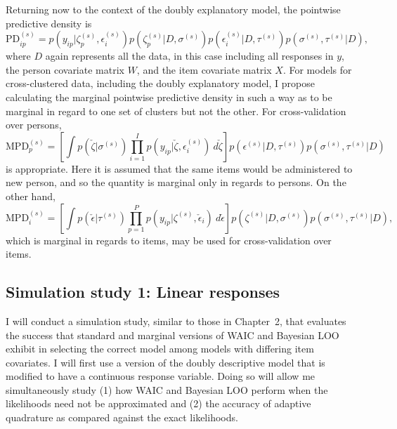 \documentclass[letterpaper]{article}
\begin{document}
Returning now to the context of the doubly explanatory model, the pointwise predictive density is
\begin{equation} \label{eq:eirm-lpd}
	\mathrm{PD}_{ip}^{(s)} = 
		p(y_{ip} | \zeta_p^{(s)}, \epsilon_i^{(s)})
		p(\zeta_p^{(s)} | D, \sigma^{(s)})
		p(\epsilon_i^{(s)} | D, \tau^{(s)}) 
		p(\sigma^{(s)}, \tau^{(s)} | D)
,\end{equation}
where $D$ again represents all the data, in this case including all responses in $y$, the person covariate matrix $W$, and the item covariate matrix $X$. For models for cross-clustered data, including the doubly explanatory model, I propose calculating the marginal pointwise predictive density in such a way as to be marginal in regard to one set of clusters but not the other. For cross-validation over persons,
\begin{equation}
	\mathrm{MPD}_p^{(s)} = 
		\left [ \int
			p(\check \zeta | \sigma^{(s)})
			\prod_{i=1}^I	p(y_{ip} | \check \zeta, \epsilon_i^{(s)})
			~d \check \zeta 
		\right ]
		p(\epsilon^{(s)} | D, \tau^{(s)}) 
		p(\sigma^{(s)}, \tau^{(s)} | D)
\end{equation}
is appropriate. Here it is assumed that the same items would be administered to new person, and so the quantity is marginal only in regards to persons. On the other hand,
\begin{equation}
	\mathrm{MPD}_i^{(s)} = 
		\left [ \int
			p(\check \epsilon | \tau^{(s)})
			\prod_{p=1}^P	p(y_{ip} | \zeta^{(s)}, \check \epsilon_i)
			~d \check \epsilon 
		\right ]
		p(\zeta^{(s)} | D, \sigma^{(s)}) 
		p(\sigma^{(s)}, \tau^{(s)} | D)
,\end{equation}
which is marginal in regards to items, may be used for cross-validation over items.


\subsection{Simulation study 1: Linear responses}

I will conduct a simulation study, similar to those in Chapter~2, that evaluates the success that standard and marginal versions of WAIC and Bayesian LOO exhibit in selecting the correct model among models with differing item covariates. I will first use a version of the doubly descriptive model that is modified to have a continuous response variable. Doing so will allow me simultaneously study (1) how WAIC and Bayesian LOO perform when the likelihoods need not be approximated and (2) the accuracy of adaptive quadrature as compared against the exact likelihoods.
\end{document}
